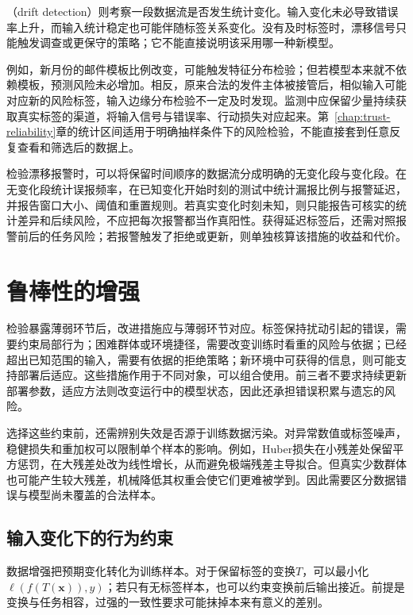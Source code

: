 （drift detection）则考察一段数据流是否发生统计变化。输入变化未必导致错误率上升，而输入统计稳定也可能伴随标签关系变化。没有及时标签时，漂移信号只能触发调查或更保守的策略；它不能直接说明该采用哪一种新模型。

例如，新月份的邮件模板比例改变，可能触发特征分布检验；但若模型本来就不依赖模板，预测风险未必增加。相反，原来合法的发件主体被接管后，相似输入可能对应新的风险标签，输入边缘分布检验不一定及时发现。监测中应保留少量持续获取真实标签的渠道，将输入信号与错误率、行动损失对应起来。第~\ref{chap:trust-reliability}章的统计区间适用于明确抽样条件下的风险检验，不能直接套到任意反复查看和筛选后的数据上。

检验漂移报警时，可以将保留时间顺序的数据流分成明确的无变化段与变化段。在无变化段统计误报频率，在已知变化开始时刻的测试中统计漏报比例与报警延迟，并报告窗口大小、阈值和重置规则。若真实变化时刻未知，则只能报告可核实的统计差异和后续风险，不应把每次报警都当作真阳性。获得延迟标签后，还需对照报警前后的任务风险；若报警触发了拒绝或更新，则单独核算该措施的收益和代价。

\section{鲁棒性的增强}
\label{sec:robustness-enhancement}

检验暴露薄弱环节后，改进措施应与薄弱环节对应。标签保持扰动引起的错误，需要约束局部行为；困难群体或环境捷径，需要改变训练时看重的风险与依据；已经超出已知范围的输入，需要有依据的拒绝策略；新环境中可获得的信息，则可能支持部署后适应。这些措施作用于不同对象，可以组合使用。前三者不要求持续更新部署参数，适应方法则改变运行中的模型状态，因此还承担错误积累与遗忘的风险。

选择这些约束前，还需辨别失效是否源于训练数据污染。对异常数值或标签噪声，稳健损失和重加权可以限制单个样本的影响。例如，Huber损失在小残差处保留平方惩罚，在大残差处改为线性增长，从而避免极端残差主导拟合。但真实少数群体也可能产生较大残差，机械降低其权重会使它们更难被学到。因此需要区分数据错误与模型尚未覆盖的合法样本。

\subsection{输入变化下的行为约束}
\label{sec:robustness-local-enhancement}

数据增强把预期变化转化为训练样本。对于保留标签的变换$T$，可以最小化$\ell(f(T(\bm{x})),y)$；若只有无标签样本，也可以约束变换前后输出接近。前提是变换与任务相容，过强的一致性要求可能抹掉本来有意义的差别。

